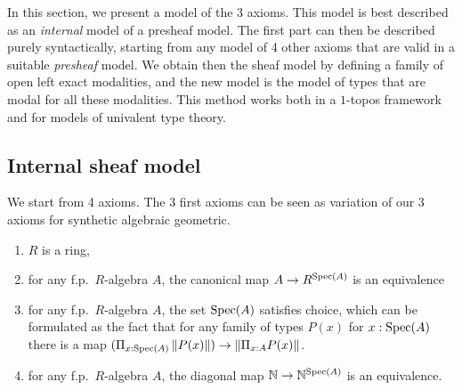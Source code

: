 \newcommand{\inc}{\mathsf{inc}}
\newcommand{\inl}{\mathsf{inl}}
\newcommand{\inr}{\mathsf{inr}}
\newcommand{\idd}{\mathsf{id}}
\newcommand{\II}{\mathbf{I}}
\newcommand{\nats}{\mathbb{N}}
\newcommand\norm[1]{\left\lVert #1 \right\rVert}


\newcommand{\Gm}{\mathsf{G_m}}
\newcommand{\ext}{\mathsf{ext}}
\newcommand{\patch}{\mathsf{patch}}
\newcommand{\cov}{\mathsf{cov}}
\newcommand{\isSheaf}{\mathsf{isSheaf}}
\newcommand{\isIso}{\mathsf{isIso}}
\newcommand{\Fib}{\mathsf{Fib}}

\newcommand{\Typp}{\mathsf{Type}}
\newcommand{\Elem}{\mathsf{Elem}}
\newcommand{\Cont}{\mathsf{Cont}}

\newcommand{\BB}{\mathcal{B}}
\newcommand{\CC}{\mathcal{C}}
\newcommand{\UU}{\mathcal{U}}
\newcommand{\WW}{\mathcal{W}}
\newcommand{\VV}{\mathcal{V}}

In this section, we present a model of the 3 axioms. This model is best described as an \emph{internal} model
of a presheaf model. The first part can then be described purely syntactically, starting from any model
of 4 other axioms that are valid in a suitable \emph{presheaf} model. We obtain then the sheaf model by defining
a family of open left exact modalities, and the new model is the model of types that are modal for all these modalities.
This method works both in a $1$-topos framework and for models of univalent type theory.

\subsection{Internal sheaf model}

We start from 4 axioms. The 3 first axioms can be seen as variation of our 3 axioms for synthetic algebraic geometric.

\begin{enumerate}
\item $R$ is a ring,
\item for any f.p.\ $R$-algebra $A$, the canonical map $A\rightarrow R^{\operatorname{Spec}(A)}$ is an equivalence
\item for any f.p.\ $R$-algebra $A$, the set $\operatorname{Spec}(A)$ satisfies choice, which can be formulated as
  the fact that for any family of types $P(x)$ for $x:\operatorname{Spec}(A)$ there is a map
  $(\Pi_{x:\Spec(A)}\norm{P(x)})\rightarrow \norm{\Pi_{x:A}P(x)}$.
\item for any f.p.\ $R$-algebra $A$, the diagonal map $\nats\rightarrow\nats^{\Spec(A)}$ is an equivalence.
  
\end{enumerate}

